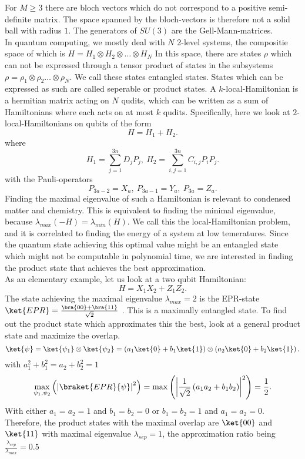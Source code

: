 For $M\ge3$ there are bloch vectors which do not correspond to a positive semi-definite matrix.
The space spanned by the bloch-vectors is therefore not a solid ball with radius $1$.
The generators of  $SU(3)$ are the Gell-Mann-matrices.  \\
In quantum computing, we mostly deal with $N$ 2-level systems, the compositie space of which is $H = H_1 \otimes H_2 \otimes \ldots \otimes H_N$
In this space, there are states $\rho$ which can not be expressed through a tensor product of states in the subsystems $\rho = \rho_1\otimes\rho_2\ldots\otimes\rho_N$.
We call these states entangled states.
States which can be expressed as such are called seperable or product states.
A $k$-local-Hamiltonian is a hermitian matrix acting on $N$ qudits, which can be written as a sum of Hamiltonians where each acts on at most $k$ qudits.
Specifically, here we look at  $2$-local-Hamiltonians on qubits of the form \[
H = H_1+H_2
.\]
where \[
	H_1 = \sum_{j=1}^{3n} D_jP_j, ~ H_2  = \sum_{i,j=1}^{3n} C_{i,j}P_iP_j
.\]
with the Pauli-operators \[
	P_{3a-2}=X_a, ~ P_{3a-1}=Y_a, ~ P_{3a}=Z_a
.\]
Finding the maximal eigenvalue of such a Hamiltonian is relevant to condensed matter and chemistry.
This is equivalent to finding the minimal eigenvalue, because $\lambda_{max}(-H)=\lambda_{min}(H)$. \cite{gharibian19}
We call this the local-Hamiltonian problem, and it is correlated to finding the energy of a system at low temeratures.
Since the quantum state achieving this optimal value might be an entangled state which might not be computable in polynomial time, we are interested in finding the product state that achieves the best approximation. \\
As an elementary example, let us look at a two qubit Hamiltonian: \[
H=X_1X_2+Z_1Z_2
.\]
The state achieving the maximal eigenvalue $\lambda_{max}=2$ is the EPR-state $\ket{EPR}=\frac{\bra{00}+\bra{11}}{\sqrt{2}}$ .
This is a maximally entangled state.
To find out the product state which approximates this the best, look at a general product state and maximize the overlap.
\[
	\ket{\psi}=\ket{\psi_1}\otimes\ket{\psi_2}=\left(a_1\ket{0}+b_1\ket{1}\right)\otimes\left(a_2\ket{0}+b_2\ket{1}\right)
.\] with $a_1^2+b_1^2=a_2+b_2^2=1$
\[
\max_{\psi_1,\psi_2}\left(\left|\braket{EPR}{\psi}\right|^2\right)=\max\left(\left|\frac{1}{\sqrt{2}}\left(a_1a_2+b_1b_2\right)\right|^2\right)=\frac{1}{2}
.\]
With either $a_1=a_2=1$ and $b_1=b_2=0$ or $b_1=b_2=1$ and $a_1=a_2=0$.
Therefore, the product states with the maximal overlap are $\ket{00}$ and $\ket{11}$ with maximal eigenvalue $\lambda_{sep}=1$, the approximation ratio being  $\frac{\lambda_{sep}}{\lambda_{max}} = 0.5 $\\
